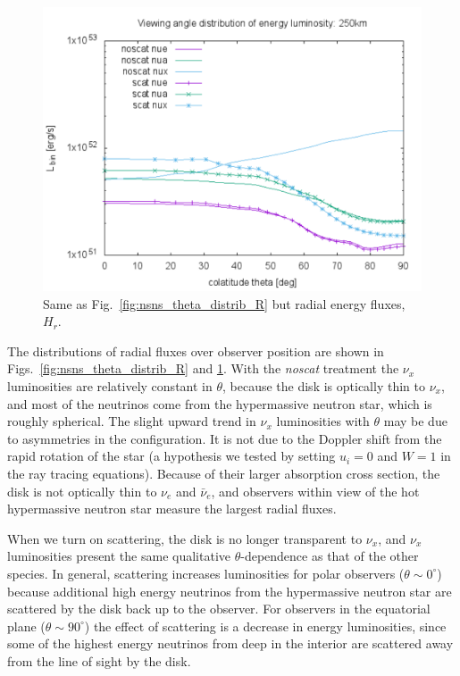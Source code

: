 \documentclass[aps,floatfix,prd,superscriptaddress,twocolumn]{revtex4-1}
\begin{document}
\begin{figure}
  \includegraphics[width=\columnwidth]{theta_distrib-250km-luminosity_L}
  \caption{Same as Fig.~\ref{fig:nsns_theta_distrib_R} but radial energy
    fluxes, $H_r$.}
  \label{fig:nsns_theta_distrib_L}
\end{figure}

The distributions of radial fluxes over observer position are shown
in Figs.~\ref{fig:nsns_theta_distrib_R} and \ref{fig:nsns_theta_distrib_L}.
With the \emph{noscat} treatment the $\nu_x$ luminosities are relatively
constant in $\theta$, because the disk is optically thin to $\nu_x$,
and most of the neutrinos come from the hypermassive neutron star,
which is roughly spherical.
The slight upward trend in $\nu_x$ luminosities with $\theta$ may be due to
asymmetries in the configuration.
It is not due to the Doppler shift from the rapid rotation of the star
(a hypothesis we tested by setting $u_i=0$ and $W=1$ in the ray
tracing equations).
Because of their larger absorption cross section,
the disk is not optically thin to $\nu_e$ and $\bar{\nu}_e$,
and observers within view of the hot hypermassive neutron star measure
the largest radial fluxes.

When we turn on scattering, the disk is no longer transparent to $\nu_x$,
and $\nu_x$ luminosities present the same qualitative $\theta$-dependence
as that of the other species.
In general, scattering increases luminosities for polar observers
($\theta \sim 0^\circ$) because additional high energy neutrinos
from the hypermassive neutron star are scattered by the disk back up to
the observer.
For observers in the equatorial plane ($\theta \sim 90^\circ$)
the effect of scattering is a decrease in energy luminosities,
since some of the highest energy neutrinos from deep in the interior
are scattered away from the line of sight by the disk.
\end{document}
